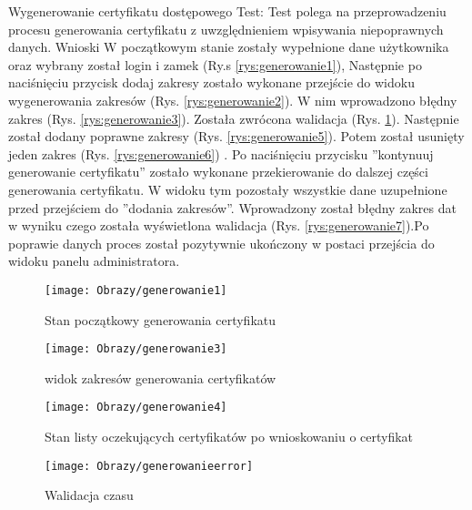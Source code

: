 \documentclass[twoside,10pt]{article}
\begin{document}
\begin{enumerate*}
\newpage
\item  Wygenerowanie certyfikatu dostępowego\newline
Test: Test polega na przeprowadzeniu procesu generowania certyfikatu z uwzględnieniem wpisywania niepoprawnych danych.\newline
Wnioski W początkowym stanie zostały wypełnione dane użytkownika oraz wybrany został login i zamek (Ry.s \ref{rys:generowanie1}), Następnie po naciśnięciu przycisk dodaj zakresy zostało wykonane przejście do widoku  wygenerowania zakresów (Rys. \ref{rys:generowanie2}). W nim wprowadzono  błędny zakres (Rys. \ref{rys:generowanie3}). Została zwrócona walidacja (Rys. \ref{rys:generowanie4}). Następnie został dodany poprawne zakresy (Rys. \ref{rys:generowanie5}). Potem został usunięty jeden zakres (Rys. \ref{rys:generowanie6})   . Po naciśnięciu przycisku ''kontynuuj generowanie certyfikatu'' zostało wykonane przekierowanie  do dalszej części generowania certyfikatu. W widoku tym pozostały wszystkie dane uzupełnione przed przejściem do ''dodania zakresów''. Wprowadzony został błędny zakres dat w wyniku czego została wyświetlona walidacja (Rys. \ref{rys:generowanie7}).Po poprawie danych proces został pozytywnie ukończony w postaci przejścia do widoku panelu administratora.

\begin{figure}[ht!]
\centering
\begin{minipage}{0.2\textwidth}
\texttt{[image: Obrazy/generowanie1]}
\caption{Stan początkowy generowania certyfikatu }
\label{rys:generowanie1}
\end{minipage}
\hspace{0.02\textwidth}
\begin{minipage}{0.2\textwidth}
\texttt{[image: Obrazy/generowanie3]}
\caption{widok zakresów generowania certyfikatów}
\label{rys:generowanie2}
\end{minipage}
\hspace{0.02\textwidth}
\begin{minipage}{0.2\textwidth}
\vspace{0.35cm}
\texttt{[image: Obrazy/generowanie4]}
\caption{Stan listy oczekujących certyfikatów po wnioskowaniu o certyfikat}
\label{rys:generowanie3}
\end{minipage}
\hspace{0.02\textwidth}
\begin{minipage}{0.2\textwidth}
\vspace{-0.4cm}
\texttt{[image: Obrazy/generowanieerror]}
\caption{Walidacja czasu }
\label{rys:generowanie4}
\end{minipage}
\end{figure}


\end{enumerate*}
\end{document}
